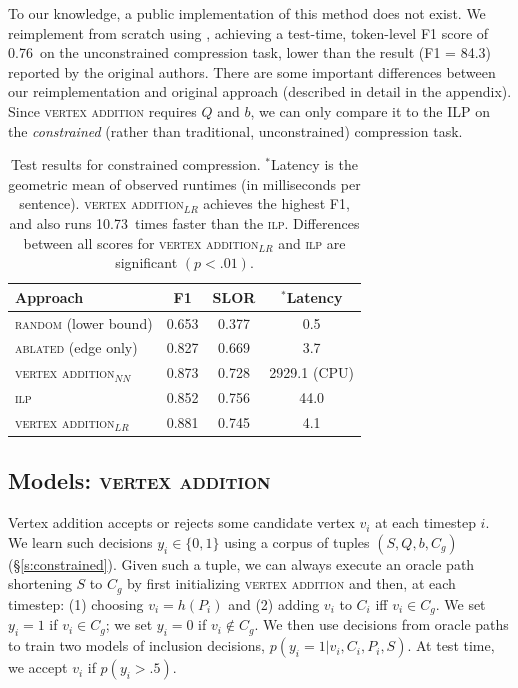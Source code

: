 \documentclass[11pt,a4paper]{article}
\newcommand{\exact}[0]{10.73~} %
\newcommand{\ilptest}[0]{0.76~}
\begin{document}
To our knowledge, a public implementation of this method does not exist. We reimplement from scratch using \citet{gurobi}, achieving a test-time, token-level F1 score of \ilptest on the unconstrained compression task, lower than the result {\small (F1 = 84.3)} reported by the original authors. There are some important differences between our reimplementation and original approach (described in detail in the appendix). Since \textsc{vertex addition} requires $Q$ and $b$, we can only compare it to the ILP on the \textit{constrained} (rather than traditional, unconstrained) compression task.


\begin{table}[htb!]
\centering
\begin{tabular}{lccc}
Approach & F1 & SLOR & $^{*}$Latency \\ \hline
\textsc{random} {\small (lower bound) }&{\small 0.653}&{\small 0.377}& {\small 0.5} \\
\textsc{ablated} {\small (edge only) }&{\small 0.827}&{\small 0.669}&{\small 3.7}\\
\textsc{vertex addition}$_{NN}$& {\small 0.873}& {\small 0.728}& {\small 2929.1} {\tiny  (CPU)} \\ \midrule 
\textsc{ilp}&{\small 0.852}& {\small 0.756}&{\small 44.0}\\
\textsc{vertex addition}$_{LR}$ & \small 0.881 & {\small 0.745}& {\small 4.1} \\
\end{tabular}
\caption{Test results for constrained compression. $^*$Latency is the geometric mean of observed runtimes (in milliseconds per sentence). \textsc{vertex addition}$_{LR}$ achieves the highest F1, and also runs \exact times faster than the \textsc{ilp}. Differences between all scores for \textsc{vertex addition}$_{LR}$ and \textsc{ilp} are significant {\tiny $(p < .01)$}.}
\label{t:results}
\end{table}

\subsection{Models: \textsc{vertex addition}}\label{s:transition}

Vertex addition accepts or rejects some candidate vertex $v_i$ at each timestep $i$. 
We learn such decisions $y_i \in \{0,1\}$ using a corpus of tuples $(S,Q,b,C_g)$ (\S\ref{s:constrained}). Given such a tuple, we can always execute an oracle path shortening $S$ to $C_g$ by first initializing \textsc{vertex addition} and then, at each timestep: (1) choosing $v_i = h(P_i)$ and (2) adding $v_i$ to $C_i$ iff $v_i \in C_g$. We set $y_i=1$ if $v_i \in C_g$; we set $y_i=0$ if $v_i \notin C_g$. We then use decisions from oracle paths to train two models of inclusion decisions, ${p(y_i  = 1 | v_i, C_i, P_i, S)}$. At test time, we accept $v_i$ if $p(y_i > .5)$.
\end{document}
